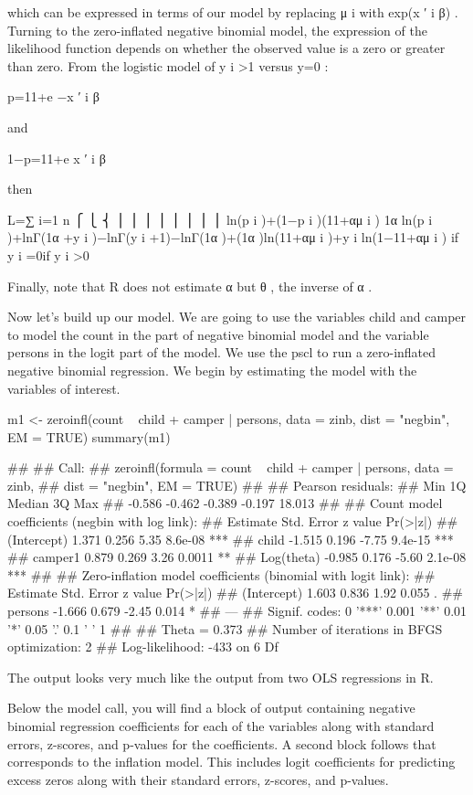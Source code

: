 which can be expressed in terms of our model by replacing μ i   with exp(x  ′  i β) . Turning to the zero-inflated negative binomial model, the expression of the likelihood function depends on whether the observed value is a zero or greater than zero. From the logistic model of y i >1  versus y=0 :

p=11+e −x  ′  i β   
 
and
 
1−p=11+e x  ′  i β   
 
then
 
L=∑ i=1 n ⎧ ⎩ ⎨ ⎪ ⎪ ⎪ ⎪ ⎪ ⎪ ⎪ ⎪ ln(p i )+(1−p i )(11+αμ i  ) 1α  ln(p i )+lnΓ(1α +y i )−lnΓ(y i +1)−lnΓ(1α )+(1α )ln(11+αμ i  )+y i ln(1−11+αμ i  ) if y i =0if y i >0  
 
Finally, note that R does not estimate α  but θ , the inverse of α .
 
Now let's build up our model. We are going to use the variables child and camper to model the count in the part of negative binomial model and the variable persons in the logit part of the model. We use the pscl to run a zero-inflated negative binomial regression. We begin by estimating the model with the variables of interest.



m1 <- zeroinfl(count ~ child + camper | persons,
  data = zinb, dist = "negbin", EM = TRUE)
summary(m1)
 
## 
## Call:
## zeroinfl(formula = count ~ child + camper | persons, data = zinb, 
##     dist = "negbin", EM = TRUE)
## 
## Pearson residuals:
##    Min     1Q Median     3Q    Max 
## -0.586 -0.462 -0.389 -0.197 18.013 
## 
## Count model coefficients (negbin with log link):
##             Estimate Std. Error z value Pr(>|z|)    
## (Intercept)    1.371      0.256    5.35  8.6e-08 ***
## child         -1.515      0.196   -7.75  9.4e-15 ***
## camper1        0.879      0.269    3.26   0.0011 ** 
## Log(theta)    -0.985      0.176   -5.60  2.1e-08 ***
## 
## Zero-inflation model coefficients (binomial with logit link):
##             Estimate Std. Error z value Pr(>|z|)  
## (Intercept)    1.603      0.836    1.92    0.055 .
## persons       -1.666      0.679   -2.45    0.014 *
## ---
## Signif. codes:  0 '***' 0.001 '**' 0.01 '*' 0.05 '.' 0.1 ' ' 1 
## 
## Theta = 0.373 
## Number of iterations in BFGS optimization: 2 
## Log-likelihood: -433 on 6 Df
 
The output looks very much like the output from two OLS regressions in R.
 
Below the model call, you will find a block of output containing negative binomial regression coefficients for each of the variables along with standard errors, z-scores, and p-values for the coefficients. A second block follows that corresponds to the inflation model. This includes logit coefficients for predicting excess zeros along with their standard errors, z-scores, and p-values.


